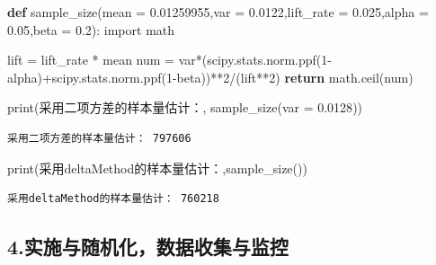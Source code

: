 \documentclass[
  letterpaper,
  DIV=11,
  numbers=noendperiod]{scrreprt}
\newenvironment{Shaded}{\begin{snugshade}}{\end{snugshade}}
\newcommand{\BuiltInTok}[1]{\textcolor[rgb]{0.00,0.23,0.31}{#1}}
\newcommand{\ControlFlowTok}[1]{\textcolor[rgb]{0.00,0.23,0.31}{\textbf{#1}}}
\newcommand{\DecValTok}[1]{\textcolor[rgb]{0.68,0.00,0.00}{#1}}
\newcommand{\FloatTok}[1]{\textcolor[rgb]{0.68,0.00,0.00}{#1}}
\newcommand{\ImportTok}[1]{\textcolor[rgb]{0.00,0.46,0.62}{#1}}
\newcommand{\KeywordTok}[1]{\textcolor[rgb]{0.00,0.23,0.31}{\textbf{#1}}}
\newcommand{\NormalTok}[1]{\textcolor[rgb]{0.00,0.23,0.31}{#1}}
\newcommand{\OperatorTok}[1]{\textcolor[rgb]{0.37,0.37,0.37}{#1}}
\newcommand{\StringTok}[1]{\textcolor[rgb]{0.13,0.47,0.30}{#1}}
\begin{document}
\begin{Shaded}
\begin{Highlighting}[]
\KeywordTok{def}\NormalTok{ sample\_size(mean }\OperatorTok{=} \FloatTok{0.01259955}\NormalTok{,var }\OperatorTok{=} \FloatTok{0.0122}\NormalTok{,lift\_rate }\OperatorTok{=} \FloatTok{0.025}\NormalTok{,alpha }\OperatorTok{=} \FloatTok{0.05}\NormalTok{,beta }\OperatorTok{=} \FloatTok{0.2}\NormalTok{):}
    \ImportTok{import}\NormalTok{ math}
    
\NormalTok{    lift }\OperatorTok{=}\NormalTok{ lift\_rate }\OperatorTok{*}\NormalTok{ mean}
\NormalTok{    num }\OperatorTok{=}\NormalTok{ var}\OperatorTok{*}\NormalTok{(scipy.stats.norm.ppf(}\DecValTok{1}\OperatorTok{{-}}\NormalTok{alpha)}\OperatorTok{+}\NormalTok{scipy.stats.norm.ppf(}\DecValTok{1}\OperatorTok{{-}}\NormalTok{beta))}\OperatorTok{**}\DecValTok{2}\OperatorTok{/}\NormalTok{(lift}\OperatorTok{**}\DecValTok{2}\NormalTok{)}
    \ControlFlowTok{return}\NormalTok{ math.ceil(num)}

\BuiltInTok{print}\NormalTok{(}\StringTok{\textquotesingle{}采用二项方差的样本量估计：\textquotesingle{}}\NormalTok{, sample\_size(var }\OperatorTok{=} \FloatTok{0.0128}\NormalTok{))}
\end{Highlighting}
\end{Shaded}

\begin{verbatim}
采用二项方差的样本量估计： 797606
\end{verbatim}

\begin{Shaded}
\begin{Highlighting}[]
\BuiltInTok{print}\NormalTok{(}\StringTok{\textquotesingle{}采用deltaMethod的样本量估计：\textquotesingle{}}\NormalTok{,sample\_size())}
\end{Highlighting}
\end{Shaded}

\begin{verbatim}
采用deltaMethod的样本量估计： 760218
\end{verbatim}

\subsection{4.实施与随机化，数据收集与监控}\label{ux5b9eux65bdux4e0eux968fux673aux5316ux6570ux636eux6536ux96c6ux4e0eux76d1ux63a7}
\end{document}
